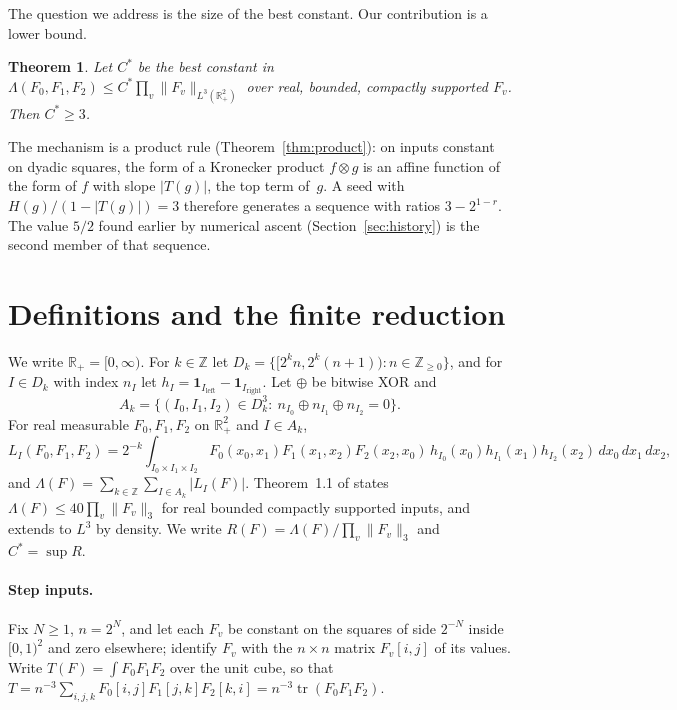 \documentclass[11pt]{article}
\newtheorem{theorem}{Theorem}[section]
\theoremstyle{remark}
\newcommand{\R}{\mathbb{R}}
\newcommand{\Z}{\mathbb{Z}}
\newcommand{\Lam}{\Lambda}
\DeclareMathOperator{\tr}{tr}
\begin{document}
The question we address is the size of the best constant. Our contribution is a lower bound.

\begin{theorem}\label{thm:main}
Let $C^\ast$ be the best constant in $\Lam(F_0,F_1,F_2)\le C^\ast\prod_{v}\|F_v\|_{L^3(\R_+^2)}$ over real, bounded,
compactly supported $F_v$. Then $C^\ast\ge3$.
\end{theorem}

The mechanism is a product rule (Theorem~\ref{thm:product}): on inputs constant on dyadic squares, the form of a
Kronecker product $f\otimes g$ is an affine function of the form of $f$ with slope $|T(g)|$, the top term of~$g$. A seed
with $H(g)/(1-|T(g)|)=3$ therefore generates a sequence with ratios $3-2^{1-r}$. The value $5/2$ found earlier by
numerical ascent (Section~\ref{sec:history}) is the second member of that sequence.

\section{Definitions and the finite reduction}

We write $\R_+=[0,\infty)$. For $k\in\Z$ let $D_k=\{[2^k n,2^k(n+1)):n\in\Z_{\ge0}\}$, and for $I\in D_k$ with index
$n_I$ let $h_I=\mathbf 1_{I_{\mathrm{left}}}-\mathbf 1_{I_{\mathrm{right}}}$. Let $\oplus$ be bitwise XOR and
\[
A_k=\{(I_0,I_1,I_2)\in D_k^3:\ n_{I_0}\oplus n_{I_1}\oplus n_{I_2}=0\}.
\]
For real measurable $F_0,F_1,F_2$ on $\R_+^2$ and $I\in A_k$,
\begin{equation}\label{eq:LI}
L_I(F_0,F_1,F_2)=2^{-k}\int_{I_0\times I_1\times I_2}F_0(x_0,x_1)F_1(x_1,x_2)F_2(x_2,x_0)\,h_{I_0}(x_0)h_{I_1}(x_1)h_{I_2}(x_2)\,dx_0\,dx_1\,dx_2,
\end{equation}
and $\Lam(F)=\sum_{k\in\Z}\sum_{I\in A_k}|L_I(F)|$. Theorem~1.1 of \cite{oai2026dyadic} states
$\Lam(F)\le40\prod_v\|F_v\|_3$ for real bounded compactly supported inputs, and extends to $L^3$ by density. We write
$R(F)=\Lam(F)/\prod_v\|F_v\|_3$ and $C^\ast=\sup R$.

\paragraph{Step inputs.}
Fix $N\ge1$, $n=2^N$, and let each $F_v$ be constant on the squares of side $2^{-N}$ inside $[0,1)^2$ and zero
elsewhere; identify $F_v$ with the $n\times n$ matrix $F_v[i,j]$ of its values. Write $T(F)=\int F_0F_1F_2$ over the unit
cube, so that $T=n^{-3}\sum_{i,j,k}F_0[i,j]F_1[j,k]F_2[k,i]=n^{-3}\tr(F_0F_1F_2)$.
\end{document}
